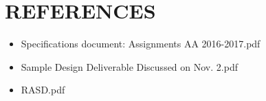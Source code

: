 \section{REFERENCES}
\begin{itemize}
	\item Specifications document: Assignments AA 2016-2017.pdf
	\item Sample Design Deliverable Discussed on Nov. 2.pdf
	\item RASD.pdf
\end{itemize}